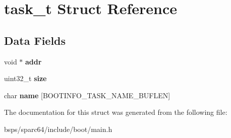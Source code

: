 \hypertarget{structtask__t}{}\section{task\+\_\+t Struct Reference}
\label{structtask__t}
\subsection*{Data Fields}
\begin{DoxyCompactItemize}
\item 
\mbox{\label{structtask__t_a6605426cbeb63452ae1e8ede716d4c24}} 
void $\ast$ {\bfseries addr}
\item 
\mbox{\label{structtask__t_ae0b75ddf14bd621c375c2b0a06136e59}} 
uint32\+\_\+t {\bfseries size}
\item 
\mbox{\label{structtask__t_ac850c6c1fea1d616c6aa3be85f5af6dd}} 
char {\bfseries name} \mbox{[}B\+O\+O\+T\+I\+N\+F\+O\+\_\+\+T\+A\+S\+K\+\_\+\+N\+A\+M\+E\+\_\+\+B\+U\+F\+L\+EN\mbox{]}
\end{DoxyCompactItemize}


The documentation for this struct was generated from the following file\+:\begin{DoxyCompactItemize}
\item 
bsps/sparc64/include/boot/main.\+h\end{DoxyCompactItemize}
